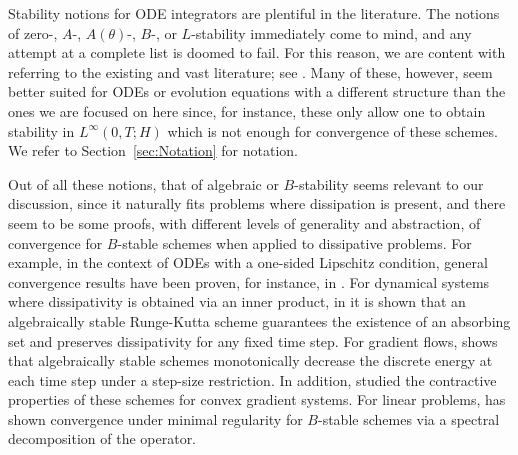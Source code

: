 \documentclass{amsart}
\theoremstyle{definition}
\begin{document}
Stability notions for ODE integrators are plentiful in the literature. The notions of zero-, $A$-, $A(\theta)$-, $B$-, or $L$-stability immediately come to mind, and any attempt at a complete list is doomed to fail. For this reason, we are content with referring to the existing and vast literature; see \cite{MR3559553,MR1227985,MR2657217,MR2840298}. Many of these, however, seem better suited for ODEs or evolution equations with a different structure than the ones we are focused on here since, for instance, these only allow  one to obtain stability in $L^\infty(0,T;H)$ which is not enough for convergence of these schemes. We refer to Section~\ref{sec:Notation} for notation.


Out of all these notions, that of algebraic or $B$-stability seems relevant to our discussion, since it naturally fits problems where dissipation is present, and there seem to be some proofs, with different levels of generality and abstraction, of convergence for $B$-stable schemes when applied to dissipative problems. For example, in the context of ODEs with a one-sided Lipschitz condition, general convergence results have been proven, for instance, in \cite[Section IV.12]{MR2657217}. For dynamical systems where dissipativity is obtained via an inner product, in \cite{MR1293524} it is shown that an algebraically stable Runge-Kutta scheme guarantees the existence of an absorbing set and preserves dissipativity for any fixed time step. For gradient flows, \cite{MR3194795} shows that algebraically stable schemes monotonically decrease the discrete energy at each time step under a step-size restriction. In addition, \cite{MR4121887} studied the contractive properties of these schemes for convex gradient systems. For linear problems, \cite{crouzeix1975approximation} has shown convergence under minimal regularity for $B$-stable schemes via a spectral decomposition of the operator.
\end{document}
